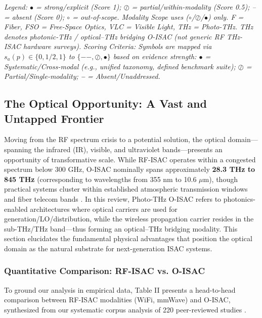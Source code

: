 \textit{Legend: $\bullet$ = strong/explicit (Score 1); $\oslash$ = partial/within-modality (Score 0.5); -- = absent (Score 0); $\circ$ = out-of-scope. Modality Scope uses ($\circ$/$\oslash$/$\bullet$) only. F = Fiber, FSO = Free-Space Optics, VLC = Visible Light, THz = Photo-THz. THz denotes photonic-THz / optical--THz bridging O-ISAC (not generic RF THz-ISAC hardware surveys).}
\textit{Scoring Criteria: Symbols are mapped via $s_a(p) \in \{0, 1/2, 1\}$ to $\{--, \oslash, \bullet\}$ based on evidence strength: \textbf{$\bullet$} = Systematic/Cross-modal (e.g., unified taxonomy, defined benchmark suite); \textbf{$\oslash$} = Partial/Single-modality; \textbf{--} = Absent/Unaddressed.}

\subsection{The Optical Opportunity: A Vast and Untapped Frontier}

Moving from the RF spectrum crisis to a potential solution, the optical domain---spanning the infrared (IR), visible, and ultraviolet bands---presents an opportunity of transformative scale. While RF-ISAC operates within a congested spectrum below 300 GHz, O-ISAC nominally spans approximately \textbf{28.3 THz to 845 THz} (corresponding to wavelengths from 355 nm to 10.6 $\mu$m), though practical systems cluster within established atmospheric transmission windows and fiber telecom bands \cite{O_ISAC_021}. In this review, Photo-THz O-ISAC refers to photonics-enabled architectures where optical carriers are used for generation/LO/distribution, while the wireless propagation carrier resides in the sub-THz/THz band---thus forming an optical--THz bridging modality. This section elucidates the fundamental physical advantages that position the optical domain as the natural substrate for next-generation ISAC systems.

\subsubsection{Quantitative Comparison: RF-ISAC vs. O-ISAC}

To ground our analysis in empirical data, Table II presents a head-to-head comparison between RF-ISAC modalities (WiFi, mmWave) and O-ISAC, synthesized from our systematic corpus analysis of 220 peer-reviewed studies \cite{O_ISAC_021}.

